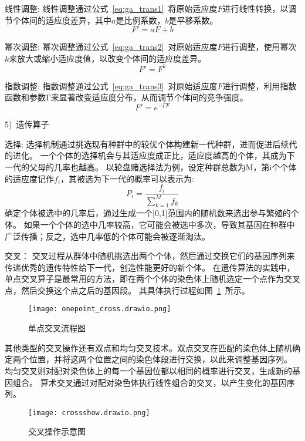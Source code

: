   线性调整:
  线性调整通过公式~\ref{eq:ga_trans1}~将原始适应度$F$进行线性转换，以调节个体间的适应度差异，其中$a$是比例系数，$b$是平移系数。
    \begin{equation}
      \label{eq:ga_trans1}
      F' = aF + b
    \end{equation}
    
    
    
    幂次调整:
    幂次调整通过公式~\ref{eq:ga_trans2}~对原始适应度$F$进行调整，使用幂次$k$来放大或缩小适应度值，以改变个体间的适应度差异。
    \begin{equation}
      \label{eq:ga_trans2}
      F' = F^k
    \end{equation}
    
    指数调整:
    指数调整通过公式~\ref{eq:ga_trans3}~对原始适应度$F$进行调整，利用指数函数和参数Γ来显著改变适应度分布，从而调节个体间的竞争强度。
    \begin{equation}
      \label{eq:ga_trans3}
      F' = e^{-\Gamma F}
    \end{equation}

5)~遗传算子\par
选择:
选择机制通过挑选现有种群中的较优个体构建新一代种群，进而促进后续代的进化。
一个个体的选择机会与其适应度成正比，适应度越高的个体，其成为下一代的父母的几率也越高。
以轮盘赌选择法为例，设定种群总数为M，第i个个体的适应度记作$f_i$，其被选为下一代的概率可以表示为:
\begin{equation}
  \label{eq:selection}
  P_i = \frac{f_i}{\sum\limits_{k=1}^{M} f_k}
\end{equation}
确定个体被选中的几率后，通过生成一个[0,1]范围内的随机数来选出参与繁殖的个体。
如果一个个体的选中几率较高，它可能会被选中多次，导致其基因在种群中广泛传播；反之，选中几率低的个体可能会被逐渐淘汰。

交叉：
交叉过程从群体中随机挑选出两个个体，然后通过交换它们的基因序列来传递优秀的遗传特性给下一代，创造性能更好的新个体。
在遗传算法的实践中，单点交叉算子是最常用的方法，即在两个个体的染色体上随机选定一个点作为交叉点，然后交换这个点之后的基因段。
其具体执行过程如图~\ref{fig:onepoint_corss}~所示。
\begin{figure}[h]
  \centering
  \texttt{[image: onepoint\_cross.drawio.png]}
  \caption{单点交叉流程图}
  \label{fig:onepoint_corss}
\end{figure}

其他类型的交叉操作还有双点和均匀交叉技术。双点交叉在匹配的染色体上随机确定两个位置，并将这两个位置之间的染色体段进行交换，以此来调整基因序列。
均匀交叉则对配对染色体上的每一个基因位都以相同的概率进行交叉，生成新的基因组合。
算术交叉通过对配对染色体执行线性组合的交叉，以产生变化的基因序列。
\begin{figure}[h]
  \centering
  \texttt{[image: crossshow.drawio.png]}
  \caption{交叉操作示意图}
  \label{fig:cross_show}
\end{figure}

